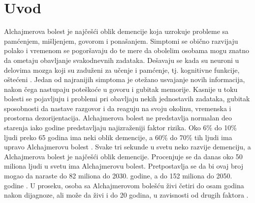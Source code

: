 \documentclass[12pt,oneside]{memoir}
\begin{document}

\frontmatter
\naslovna
\komisija

\apstrakt

\tableofcontents{}

\mainmatter


\setcounter{secnumdepth}{4}

\chapter{Uvod}

Alchajmerova bolest je najčešći oblik demencije koja uzrokuje probleme sa pamćenjem, mišljenjem, govorom i ponašanjem. Simptomi se obično razvijaju polako i vremenom se pogoršavaju do te mere da obolelim osobama mogu znatno da ometaju obavljanje svakodnevnih zadataka. Dešavaju se kada su neuroni u delovima mozga koji su zaduženi za učenje i pamćenje, tj. kognitivne funkcije, oštećeni \cite{Alzheimerfactsfigures}. Jedan od najranijih simptoma je otežano usvajanje novih informacija, nakon čega nastupaju poteškoće u govoru i gubitak memorije. Kasnije u toku bolesti se pojavljuju i problemi pri obavljaju nekih jednostavih zadataka, gubitak sposobnosti da nastave razgovor i da reaguju na svoju okolinu, vremenska i prostorna dezorijentacija. Alchajmerova bolest ne predstavlja normalan deo starenja iako godine predstavljaju najizraženiji faktor rizika. Oko 6\% do 10\% ljudi preko 65 godina ima neki oblik demencije, a 60\% do 70\% tih ljudi ima upravo Alchajmerovu bolest \cite{actavis}. Svake tri sekunde u svetu neko razvije demenciju, a Alchajmerova bolest je najčešći oblik demencije. Procenjuje se da danas oko 50 miliona ljudi u svetu ima Alchajmerovu bolest. Pretpostavlja se da bi ovaj broj mogao da naraste do 82 miliona do 2030. godine, a do 152 miliona do 2050. godine \cite{Languageimpairment}. U proseku, osoba sa Alchajmerovom bolešću živi četiri do osam godina nakon dijagnoze, ali može da živi i do 20 godina, u zavisnosti od drugih faktora \cite{seracell}.
\end{document}
